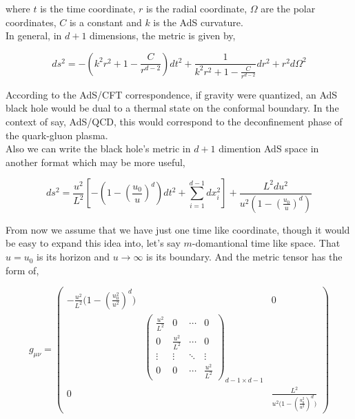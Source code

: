 where $t$ is the time coordinate, $r$ is the radial coordinate, $\Omega$ are the polar coordinates, $C$ is a constant and $k$ is the AdS curvature.\\

In general, in $d+1$ dimensions, the metric is given by,

\begin{equation}
    ds^2 = - \left( k^2r^2 + 1 - \frac{C}{r^{d-2}} \right)dt^2 + \frac{1}{k^2r^2 + 1 - \frac{C}{r^{d-2}}}dr^2 + r^2 d\Omega^2
\end{equation}

According to the AdS/CFT correspondence, if gravity were quantized, an AdS black hole would be dual to a thermal state on the conformal boundary. In the context of say, AdS/QCD, this would correspond to the deconfinement phase of the quark-gluon plasma.\\

Also we can write the black hole's metric in $d+1$ dimention AdS space in another format which may be more useful,

\begin{equation}
    ds^2 = \frac{u^2}{L^2} \left[ -(1-(\frac{u_0}{u})^d) dt^2 + \sum\limits_{i=1}^{d-1} dx_i^2 \right] + \frac{L^2 du^2}{u^2 (1-(\frac{u_0}{u})^d)}
\end{equation}

From now we assume that we have just one time like coordinate, though it would be easy to expand this idea into, let's say $m$-domantional time like space. That $u=u_0$ is its horizon and $u\rightarrow\infty$ is its boundary. And the metric tensor has the form of,

\begin{equation}\label{eq:nAdSmetrictensor}
    g_{\mu\nu} = 
    \begin{pmatrix}
        -\frac{u^2}{L^2}\big(1-(\frac{u_0^2}{u^2})^d\big) & & 0 \\
        & \begin{pmatrix}
            \frac{u^2}{L^2} & 0 & \cdots & 0 \\
            0 & \frac{u^2}{L^2} & \cdots & 0 \\
            \vdots  & \vdots  & \ddots & \vdots  \\
            0 & 0 & \cdots & \frac{u^2}{L^2}
        \end{pmatrix}_{d-1 \times d-1}
        &\\
        0 & & \frac{L^2}{u^2\big(1-(\frac{u_0^2}{u^2})^d\big)} 
    \end{pmatrix}
\end{equation}

